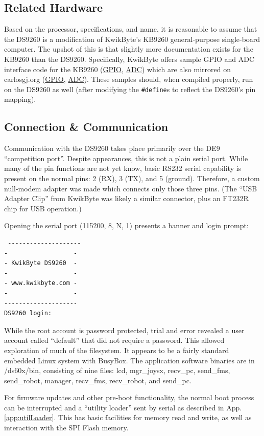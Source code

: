 \documentclass[]{article}
\begin{document}
\subsection{Related Hardware}
\label{sec:related_hardware}
\par Based on the processor, specifications, and name, it is reasonable to assume that the DS9260 is a modification of KwikByte's KB9260 general-purpose single-board computer. The upshot of this is that slightly more documentation exists for the KB9260 than the DS9260. Specifically, KwikByte offers sample GPIO and ADC interface code for the KB9260 (\href{http://kwikbyte.com/KB9260/source/gpio.zip}{GPIO}, \href{http://kwikbyte.com/KB9260/source/adc.zip}{ADC}) which are also mirrored on carlosgj.org (\href{http://carlosgj.org/FRC/DS9260/gpio.zip}{GPIO}, \href{http://carlosgj.org/FRC/DS9260/adc.zip}{ADC}). These samples should, when compiled properly, run on the DS9260 as well (after modifying the \texttt{\#define}s to reflect the DS9260's pin mapping).
\subsection{Connection \& Communication}
\par Communication with the DS9260 takes place primarily over the DE9 ``competition port''. Despite appearances, this is not a plain serial port. While many of the pin functions are not yet know, basic RS232 serial capability is present on the normal pins: 2 (RX), 3 (TX), and 5 (ground). Therefore, a custom null-modem adapter was made which connects only those three pins. (The ``USB Adapter Clip'' from KwikByte was likely a similar connector, plus an FT232R chip for USB operation.)
\par Opening the serial port (115200, 8, N, 1) presents a banner and login prompt:
\begin{verbatim}
 --------------------
-                  -
- KwikByte DS9260  -
-                  -
- www.kwikbyte.com -
-                  -
--------------------
DS9260 login:
\end{verbatim}
While the root account is password protected, trial and error revealed a user account called ``default'' that did not require a  password. This allowed exploration of much of the filesystem. It appears to be a fairly standard embedded Linux system with BusyBox. The application software binaries are in /ds60x/bin, consisting of nine files: lcd, mgr\_joysx, recv\_pc, send\_fms, send\_robot, manager, recv\_fms, recv\_robot, and send\_pc.
\par For firmware updates and other pre-boot functionality, the normal boot process can be interrupted and a ``utility loader'' sent by serial as described in App. \ref{app:utilLoader}. This has basic facilities for memory read and write, as well as interaction with the SPI Flash memory.
\end{document}
